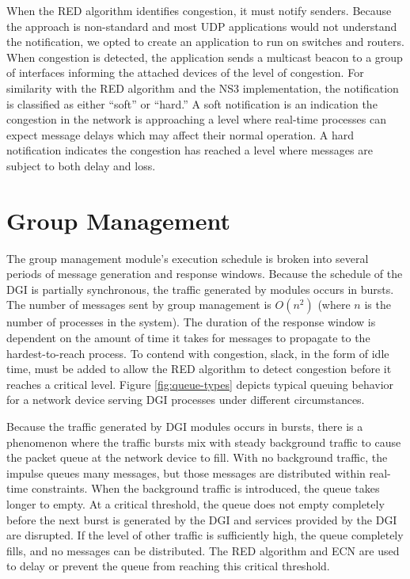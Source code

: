 When the \ac{RED} algorithm identifies congestion, it must notify senders.
Because the approach is non-standard and most UDP applications would not understand the notification, we opted to create an application to run on switches and routers.
When congestion is detected, the application sends a multicast beacon to a group of interfaces informing the attached devices of the level of congestion.
For similarity with the \ac{RED} algorithm and the \ac{NS3} implementation, the notification is classified as either ``soft'' or ``hard.''
A soft notification is an indication the congestion in the network is approaching a level where real-time processes can expect message delays which may affect their normal operation.
A hard notification indicates the congestion has reached a level where messages are subject to both delay and loss.

\section{Group Management}

The group management module's execution schedule is broken into several periods of message generation and response windows.
Because the schedule of the \ac{DGI} is partially synchronous, the traffic generated by modules occurs in bursts.
The number of messages sent by group management is $O(n^2)$ (where $n$ is the number of processes in the system).
The duration of the response window is dependent on the amount of time it takes for messages to propagate to the hardest-to-reach process.
To contend with congestion, slack, in the form of idle time, must be added to allow the \ac{RED} algorithm to detect congestion before it reaches a critical level.
Figure \ref{fig:queue-types} depicts typical queuing behavior for a network device serving \ac{DGI} processes under different circumstances.

Because the traffic generated by \ac{DGI} modules occurs in bursts, there is a phenomenon where the traffic bursts mix with steady background traffic to cause the packet queue at the network device to fill.
With no background traffic, the impulse queues many messages, but those messages are distributed within real-time constraints.
When the background traffic is introduced, the queue takes longer to empty.
At a critical threshold, the queue does not empty completely before the next burst is generated by the \ac{DGI} and services provided by the \ac{DGI} are disrupted.
If the level of other traffic is sufficiently high, the queue completely fills, and no messages can be distributed.
The \ac{RED} algorithm and \ac{ECN} are used to delay or prevent the queue from reaching this critical threshold.

